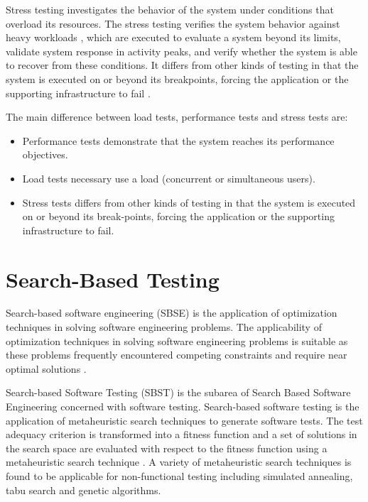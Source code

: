 \documentclass[espaco=umemeio,chapter=TITLE,twoside,openright]{abnt}
\begin{document}
Stress testing investigates the behavior of the system under conditions
that overload its resources. The stress testing verifies the system behavior against heavy workloads \cite{Sandler2004} \cite{Lewis2005}, which are executed to evaluate a system beyond its limits, validate system response in activity peaks, and verify whether the system is able to recover from these conditions. It differs from other kinds of testing in that the system is executed on or beyond its breakpoints, forcing the application or the supporting infrastructure to fail \cite{DiLucca2006} \cite{Molyneaux2009}.

The main difference between load tests, performance tests and stress tests are:

\begin{itemize}

\item Performance tests demonstrate that the system reaches its performance objectives.
\item Load tests necessary use a load (concurrent or simultaneous users).
\item Stress tests differs from other kinds of testing in that the system is executed on or beyond its break-points, forcing the application or the supporting infrastructure to fail.
\end{itemize}


\section{Search-Based Testing}

Search-based software engineering (SBSE) is the application of optimization techniques in solving software engineering problems. The applicability of optimization techniques in solving software engineering problems is suitable as these problems frequently encountered competing constraints and require near optimal solutions \cite{Afzal2009a} \cite{Harman2015}.


Search-based Software Testing (SBST) is the subarea of Search Based Software Engineering concerned with software testing. Search-based software testing is the application of metaheuristic search techniques to generate software tests. The test adequacy criterion is transformed into a fitness function and a set of solutions in the search space are evaluated with respect to the fitness function using a metaheuristic search technique \cite{Afzal2009a} \cite{Aleti2016} \cite{Harman2015}. A variety of metaheuristic search techniques is found to be applicable for non-functional testing including simulated annealing, tabu search and genetic algorithms.
\end{document}
